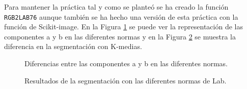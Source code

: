\documentclass[a4paper,12pt]{report}
\begin{document}
 Para mantener la práctica tal y como se planteó se ha creado la función \texttt{RGB2LAB76} aunque también se ha hecho una versión de esta práctica con la función de Scikit-image. En la Figura \ref{normaslab} se puede ver la representación de las componentes a y b en las diferentes normas y en la Figura \ref{comparativalab} se muestra la diferencia en la segmentación con K-medias.\\

\begin{figure}[!tbp]
  \centering
  \hfill
  \caption{Diferencias entre las componentes a y b en las diferentes normas.}
  \label{normaslab}
\end{figure}

\begin{figure}[!tbp]
  \centering
  \hfill
  \caption{Resultados de la segmentación con las diferentes normas de Lab.}
  \label{comparativalab}
\end{figure}
\end{document}
